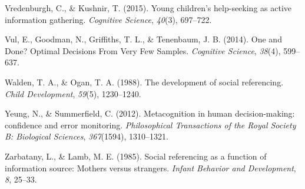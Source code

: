 \documentclass[english,man]{apa6}
\theoremstyle{definition}
\theoremstyle{definition}
\theoremstyle{definition}
\theoremstyle{remark}
\begin{document}
\hypertarget{ref-Vredenburgh2015}{}
Vredenburgh, C., \& Kushnir, T. (2015). Young children's help-seeking as
active information gathering. \emph{Cognitive Science}, \emph{40}(3),
697--722.

\hypertarget{ref-Vul2014}{}
Vul, E., Goodman, N., Griffiths, T. L., \& Tenenbaum, J. B. (2014). One
and Done? Optimal Decisions From Very Few Samples. \emph{Cognitive
Science}, \emph{38}(4), 599--637.

\hypertarget{ref-Walden1988}{}
Walden, T. A., \& Ogan, T. A. (1988). The development of social
referencing. \emph{Child Development}, \emph{59}(5), 1230--1240.

\hypertarget{ref-Yeung2012}{}
Yeung, N., \& Summerfield, C. (2012). Metacognition in human
decision-making: confidence and error monitoring. \emph{Philosophical
Transactions of the Royal Society B: Biological Sciences},
\emph{367}(1594), 1310--1321.

\hypertarget{ref-Zarbatany1985}{}
Zarbatany, L., \& Lamb, M. E. (1985). Social referencing as a function
of information source: Mothers versus strangers. \emph{Infant Behavior
and Development}, \emph{8}, 25--33.
\end{document}
